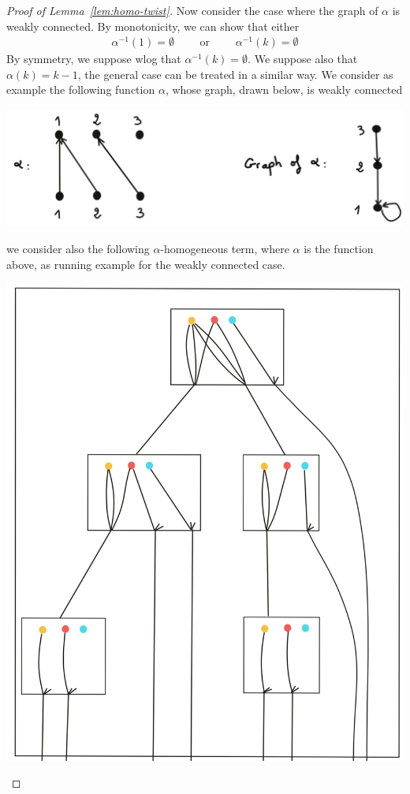 \begin{proof}[Proof of Lemma~\ref{lem:homo-twist}]
\medskip
Now consider the case where the graph of $\alpha$ is weakly connected. By monotonicity, we can show that either
\begin{align*}
\alpha^{-1}(1)=\emptyset\qquad\text{ or }\qquad\alpha^{-1}(k)=\emptyset
\end{align*}
By symmetry, we suppose wlog that $\alpha^{-1}(k)=\emptyset$. We suppose also that $\alpha(k)=k-1$, the general case can be treated in a similar way.
We consider as example the following function $\alpha$, whose graph, drawn below, is weakly connected
\begin{center}
\includegraphics[scale=.1]{MyPic32.jpg}
\end{center}
we consider also the following $\alpha$-homogeneous term, where $\alpha$ is the function above, as running example for the weakly connected case. 
\begin{center}
\includegraphics[scale=.1]{MyPic33.jpg}

\end{center}
\end{proof}
